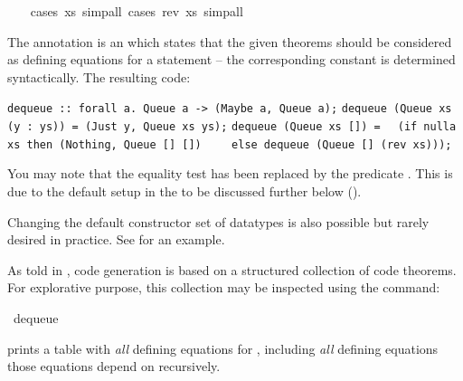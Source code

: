 \begin{isabellebody}
\ \ \isamarkupfalse%
\ {\isacharparenleft}cases\ xs{\isacharcomma}\ simp{\isacharunderscore}all{\isacharparenright}\ {\isacharparenleft}cases\ {\isachardoublequoteopen}rev\ xs{\isachardoublequoteclose}{\isacharcomma}\ simp{\isacharunderscore}all{\isacharparenright}%
\endisatagquoteme
{\isafoldquoteme}%
%
\isadelimquoteme
%
\endisadelimquoteme
%
\begin{isamarkuptext}%
\noindent The annotation  is an 
   which states that the given theorems should be
  considered as defining equations for a  statement --
  the corresponding constant is determined syntactically.  The resulting code:%
\end{isamarkuptext}%
\isamarkuptrue%
%
\isadelimquoteme
%
\endisadelimquoteme
%
\isatagquoteme
%
\begin{isamarkuptext}%
\isaverbatim%
\noindent%
\verb|dequeue :: forall a. Queue a -> (Maybe a, Queue a);|\newline%
\verb|dequeue (Queue xs (y : ys)) = (Just y, Queue xs ys);|\newline%
\verb|dequeue (Queue xs []) =|\newline%
\verb|  (if nulla xs then (Nothing, Queue [] [])|\newline%
\verb|    else dequeue (Queue [] (rev xs)));|%
\end{isamarkuptext}%
\isamarkuptrue%
%
\endisatagquoteme
{\isafoldquoteme}%
%
\isadelimquoteme
%
\endisadelimquoteme
%
\begin{isamarkuptext}%
\noindent You may note that the equality test  has been
  replaced by the predicate .  This is due to the default
  setup in the  to be discussed further below ().

  Changing the default constructor set of datatypes is also
  possible but rarely desired in practice.  See  for an example.

  As told in , code generation is based
  on a structured collection of code theorems.
  For explorative purpose, this collection
  may be inspected using the \hyperlink{command.code-thms}{\mbox{}} command:%
\end{isamarkuptext}%
\isamarkuptrue%
%
\isadelimquoteme
%
\endisadelimquoteme
%
\isatagquoteme
{}\isamarkupfalse%
\ dequeue%
\endisatagquoteme
{\isafoldquoteme}%
%
\isadelimquoteme
%
\endisadelimquoteme
%
\begin{isamarkuptext}%
\noindent prints a table with \emph{all} defining equations
  for , including
  \emph{all} defining equations those equations depend
  on recursively.
  

\end{isamarkuptext}
\end{isabellebody}
